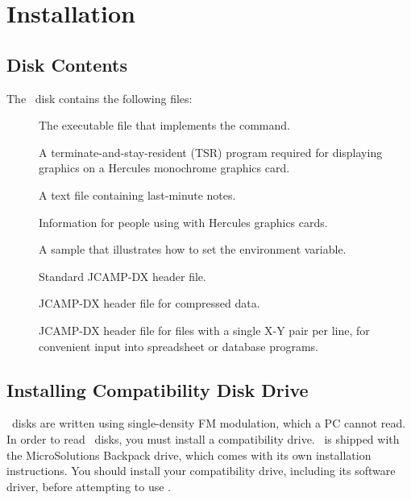 \newpage

\chapter{Installation}
 
\section{Disk Contents}
The \RD\ disk contains the following files:
 
\begin{description}
\item[] \nl
The executable file that implements the  command.  
 
\item[] \nl
A terminate-and-stay-resident (TSR) program required for displaying
graphics on a Hercules monochrome graphics card.

\item[] \nl
A text file containing last-minute notes.

\item[] \nl
Information for people using  with Hercules graphics
cards. 

\item[] \nl
A sample that illustrates how to set the  environment
variable. 

\item[] \nl
Standard JCAMP-DX header file.

\item[] \nl
JCAMP-DX header file for compressed data.

\item[] \nl
JCAMP-DX header file for files with a single X-Y pair per line, for
convenient input into spreadsheet or database programs.

\end{description}
 
\newpage 
\section{Installing Compatibility Disk Drive}

\OS\ disks are written using single-density FM modulation, which a
PC cannot read.  In order to read \OS\ disks, you must install a
compatibility drive.  \RD\ is shipped with the MicroSolutions
Backpack drive, which comes with its own installation instructions.
You should install your compatibility drive, including its software
driver, before attempting to use \RD.

